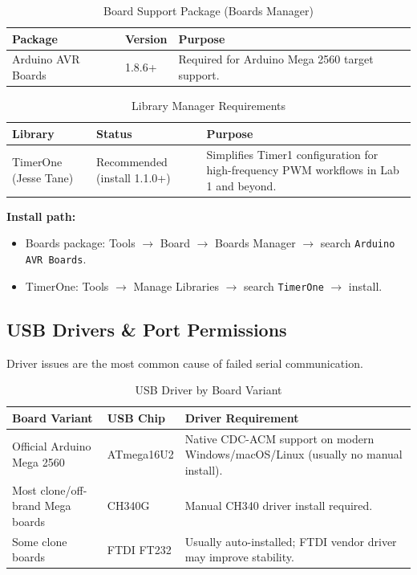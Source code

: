 \documentclass[12pt]{article}
\begin{document}
\begin{table}[h]
\centering
\caption{Board Support Package (Boards Manager)}
\begin{tabularx}{\linewidth}{l l X}
\toprule
\textbf{Package} & \textbf{Version} & \textbf{Purpose} \\ \midrule
Arduino AVR Boards & 1.8.6+ & Required for Arduino Mega 2560 target support. \\
\bottomrule
\end{tabularx}
\end{table}

\begin{table}[h]
\centering
\caption{Library Manager Requirements}
\begin{tabularx}{\linewidth}{l l X}
\toprule
\textbf{Library} & \textbf{Status} & \textbf{Purpose} \\ \midrule
TimerOne (Jesse Tane) & Recommended (install 1.1.0+) & Simplifies Timer1 configuration for high-frequency PWM workflows in Lab 1 and beyond. \\
\bottomrule
\end{tabularx}
\end{table}

\textbf{Install path:}
\begin{itemize}
    \item Boards package: Tools $\rightarrow$ Board $\rightarrow$ Boards Manager $\rightarrow$ search \texttt{Arduino AVR Boards}.
    \item TimerOne: Tools $\rightarrow$ Manage Libraries $\rightarrow$ search \texttt{TimerOne} $\rightarrow$ install.
\end{itemize}

\subsection{USB Drivers \& Port Permissions}
Driver issues are the most common cause of failed serial communication.

\begin{table}[h]
\centering
\caption{USB Driver by Board Variant}
\begin{tabularx}{\linewidth}{l l X}
\toprule
\textbf{Board Variant} & \textbf{USB Chip} & \textbf{Driver Requirement} \\ \midrule
Official Arduino Mega 2560 & ATmega16U2 & Native CDC-ACM support on modern Windows/macOS/Linux (usually no manual install). \\
Most clone/off-brand Mega boards & CH340G & Manual CH340 driver install required. \\
Some clone boards & FTDI FT232 & Usually auto-installed; FTDI vendor driver may improve stability. \\
\bottomrule
\end{tabularx}
\end{table}
\end{document}
